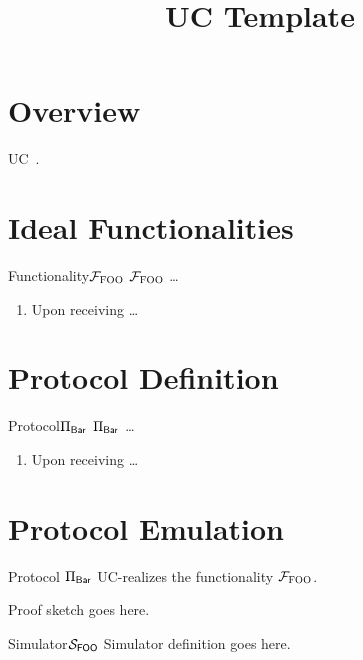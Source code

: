 \documentclass{llncs}
\title{UC Template}
\author{}
\institute{}
\begin{document}
\maketitle

\section{Overview}

UC~\cite{canetti2001universally}.

\section{Ideal Functionalities}

\begin{boxdef}{Functionality}{$\mathcal{{F}}_{\textsc{FOO}}$}
  $\mathcal{{F}}_{\textsc{FOO}}$ \ldots
  \begin{enumerate}
    \item Upon receiving \ldots
  \end{enumerate}
\end{boxdef}

\section{Protocol Definition}

\begin{boxdef}{Protocol}{$\Pi_{\sf Bar}$}
  $\Pi_{\sf Bar}$ \ldots
  \begin{enumerate}
    \item Upon receiving \ldots
   \end{enumerate}
\end{boxdef}

\section{Protocol Emulation}

\begin{theorem}
Protocol $\Pi_{\sf Bar}$ UC-realizes the functionality $\mathcal{{F}}_{\textsc{FOO}}$.
\end{theorem}

\begin{proof-sketch}
Proof sketch goes here.

\begin{boxdef}{Simulator}{$\mathcal{{S}}_{\sf FOO}$}
Simulator definition goes here.
\end{boxdef}
\end{proof-sketch}
    


\end{document}

